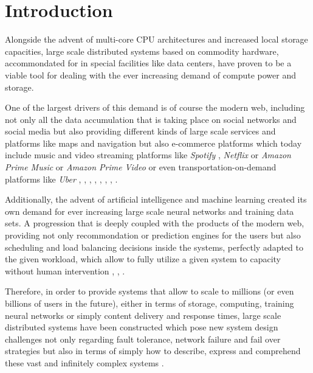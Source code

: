 \section{Introduction}
Alongside the advent of multi-core CPU architectures
and increased local storage capacities, large scale distributed
systems based on commodity hardware, accommondated for in special
facilities like data centers, have proven to be a viable tool for
dealing with the ever increasing demand of compute power and
storage.

One of the largest drivers of this demand is of course
the modern web, including not only all the data accumulation
that is taking place on social networks and social media but also
providing different kinds of large scale services and platforms
like maps and navigation but also e-commerce platforms which
today include music and video streaming platforms like
\textit{Spotify} ,
\textit{Netflix}
or \textit{Amazon Prime Music} or
\textit{Amazon Prime Video}
or even transportation-on-demand
platforms like \textit{Uber}
\cite{spotify}, \cite{spotifywiki},
\cite{netflix}, \cite{netflixwiki},
\cite{amazonprimemusic}, \cite{amazonprimevideo},
\cite{uber}, \cite{uberwiki}.

Additionally, the advent of artificial intelligence and
machine learning created its own demand for ever increasing
large scale neural networks and training data sets. A progression
that is deeply coupled with the products of the modern web,
providing not only recommondation or prediction engines for
the users but also scheduling and load balancing decisions
inside the systems, perfectly adapted to the given workload,
which allow to fully utilize a given system to capacity without
human intervention \cite{quasar}, \cite{mlcloud1}, \cite{mlcloud2}.
\newline

Therefore, in order to provide systems that allow to scale to millions
(or even billions of users in the future), either in terms of storage, computing,
training neural networks or simply content delivery and response times,
large scale distributed systems have been constructed which pose new
system design challenges not only regarding fault tolerance, network failure
and fail over strategies but also in terms of simply how to
describe, express and comprehend these vast and infinitely
complex systems \cite{howtoscaleuber}.







